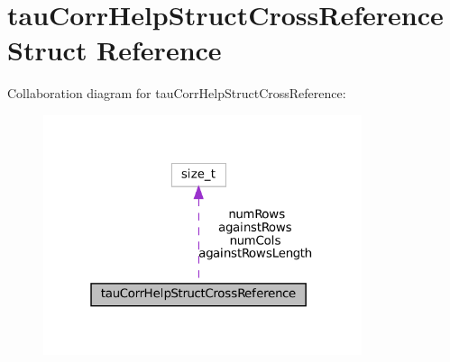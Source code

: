 \hypertarget{structtauCorrHelpStructCrossReference}{}\section{tau\+Corr\+Help\+Struct\+Cross\+Reference Struct Reference}
\label{structtauCorrHelpStructCrossReference}


Collaboration diagram for tau\+Corr\+Help\+Struct\+Cross\+Reference\+:\nopagebreak
\begin{figure}[H]
\begin{center}
\leavevmode
\includegraphics[width=265pt]{structtauCorrHelpStructCrossReference__coll__graph}
\end{center}
\end{figure}
